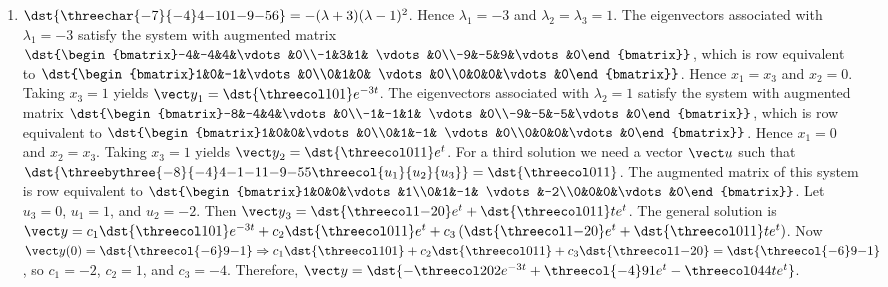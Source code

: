 \documentclass[openany]{book}
\newenvironment{sectionSolutions}{
 \begin{enumerate}[item-label={\thesection.\arabic{enumi}.}]
}{
 \end{enumerate}
}
\begin{document}
\begin{sectionSolutions}
\item
$\dst{\threechar{-7}{-4}4{-1}01{-9}{-5}6}
=-(\lambda+3)(\lambda-1)^2$.
Hence $\lambda_1=-3$ and  $\lambda_2=\lambda_3=1$.
The eigenvectors associated
 with $\lambda_1=-3$ satisfy the system with  augmented matrix
$\dst{\begin{bmatrix}-4&-4&4&\vdots&0\\-1&3&1&
\vdots&0\\-9&-5&9&\vdots&0\end{bmatrix}}$,
which is row equivalent to
$\dst{\begin{bmatrix}1&0&-1&\vdots&0\\0&1&0&
\vdots&0\\0&0&0&\vdots&0\end{bmatrix}}$.
Hence  $x_1=x_3$ and $x_2=0$.  Taking $x_3=1$
yields
${\vect y}_1=\dst{\threecol101}e^{-3t}$.
The eigenvectors associated
 with $\lambda_2=1$ satisfy the system with  augmented matrix
$\dst{\begin{bmatrix}-8&-4&4&\vdots&0\\-1&-1&1&
\vdots&0\\-9&-5&-5&\vdots&0\end{bmatrix}}$,
which is row equivalent to
$\dst{\begin{bmatrix}1&0&0&\vdots&0\\0&1&-1&
\vdots&0\\0&0&0&\vdots&0\end{bmatrix}}$.
Hence  $x_1=0$ and $x_2=x_3$.  Taking $x_3=1$
yields
${\vect y}_2=\dst{\threecol011}e^t$.
For a third solution we need a vector ${\vect u}$ such that
$\dst{\threebythree{-8}{-4}4{-1}{-1}1{-9}{-5}5\threecol{u_1}{u_2}{u_3}}
=\dst{\threecol011}$.
The augmented matrix of this system is row equivalent to
$\dst{\begin{bmatrix}1&0&0&\vdots&1\\0&1&-1&
\vdots&-2\\0&0&0&\vdots&0\end{bmatrix}}$.
Let $u_3=0$, $u_1=1$, and $u_2=-2$. Then ${\vect
y}_3=\dst{\threecol1{-2}0}e^t+\dst{\threecol011}te^{t}$. The general
solution is
${\vect y}=c_1\dst{\threecol101}e^{-3t}+ c_2\dst{\threecol011}e^t+
c_3\left(\dst{\threecol1{-2}0}e^t+\dst{\threecol011}te^{t}\right)$.
Now ${\vect y}(0)=\dst{\threecol{-6}9{-1}}\Rightarrow
c_1\dst{\threecol101}+ c_2\dst{\threecol011}+
c_3\dst{\threecol1{-2}0}=\dst{\threecol{-6}9{-1}}$,
so $c_1=-2$, $c_2=1$, and $c_3=-4$.  Therefore,
${\vect y}=\dst{-\threecol202e^{-3t}+\threecol{-4}91e^t-
\threecol044te^t}$.



\end{sectionSolutions}
\end{document}
